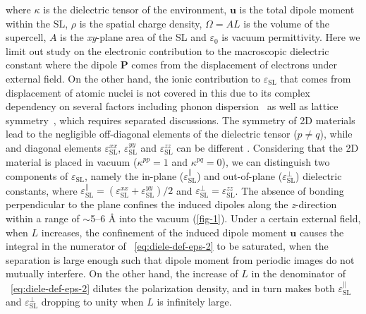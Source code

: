 where $\kappa$ is the dielectric tensor of the environment,
$\symbf{u}$ is the total dipole moment within the SL, $\rho$ is the
spatial charge density, $\Omega=AL$ is the volume of the supercell,
$A$ is the \textit{xy}-plane area of the SL and $\varepsilon_{0}$ is
vacuum permittivity. Here we limit out study on the electronic
contribution to the macroscopic dielectric constant where the dipole
$\symbf{P}$ comes from the displacement of electrons under external
field.  On the other hand, the ionic contribution to
$\varepsilon_{\mathrm{SL}}$ that comes from displacement of atomic
nuclei is not covered in this due to its complex dependency on several
factors including phonon dispersion~\cite{Sohier_2017_phonon} as well
as lattice symmetry~\cite{Laturia_2018_2D_eps}, which requires
separated discussions.  The symmetry of 2D materials lead to the
negligible off-diagonal elements of the dielectric tensor
($p \neq q$), while and diagonal elements
$\varepsilon_{\mathrm{SL}}^{xx}$, $\varepsilon_{\mathrm{SL}}^{yy}$ and
$\varepsilon_{\mathrm{SL}}^{zz}$ can be different
\cite{Sohier_2016_2D_eps}.  Considering that the 2D material is placed
in vacuum ($\kappa^{pp} = 1$ and $\kappa^{pq} = 0$), we can
distinguish two components of $\varepsilon_{\mathrm{SL}}$, namely the
in-plane ($\varepsilon_{\mathrm{SL}}^{\parallel}$) and out-of-plane
($\varepsilon_{\mathrm{SL}}^{\perp}$) dielectric constants, where
$\varepsilon_{\mathrm{SL}}^{\parallel} =
(\varepsilon_{\mathrm{SL}}^{xx} + \varepsilon_{\mathrm{SL}}^{yy})/2$
and
$\varepsilon_{\mathrm{SL}}^{\perp} = \varepsilon_{\mathrm{SL}}^{zz}$.
The absence of bonding perpendicular to the plane confines the induced
dipoles along the \textit{z}-direction within a range of $\sim{}$5--6
\AA{} into the vacuum (\autoref{fig-1}).
%
%
Under a certain external field, when $L$ increases, the confinement of
the induced dipole moment $\symbf{u}$ causes the integral in the
numerator of ~\autoref{eq:diele-def-eps-2} to be saturated, when the
separation is large enough such that dipole moment from periodic
images do not mutually interfere. On the other hand, the increase of
$L$ in the denominator of ~\autoref{eq:diele-def-eps-2} dilutes the polarization density, and in turn makes both
$\varepsilon^{\parallel}_{\mathrm{SL}}$ and
$\varepsilon^{\perp}_{\mathrm{SL}}$ dropping to
unity when $L$ is infinitely large.
%
